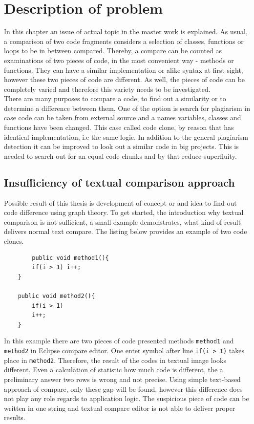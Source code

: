\documentclass{report}
\begin{document}
\chapter{Description of problem}
\label{cha:Description}
In this chapter an issue of actual topic in the master work is explained. As usual, a comparison of two code fragments considers a selection of classes, functions or loops to be in between compared. Thereby, a compare can be counted as examinations of two pieces of code, in the most convenient way - methods or functions. They can have a similar implementation or alike syntax at first sight, however these two pieces of code are different. As well, the pieces of code can be completely varied and therefore this variety needs to be investigated. 
\\
There are many purposes to compare a code, to find out a similarity or to determine a difference between them. One of the option is search for plagiarism in case code can be taken from external source and a names variables, classes and functions have been changed. This case called code clone, by reason that has identical implementation, i.e the same logic. In addition to the general plagiarism detection it can be improved to look out a similar code in big projects. This is needed to search out for an equal code chunks and by that reduce superfluity.

\section{Insufficiency of textual comparison approach}
Possible result of this thesis is development of concept or and idea to find out code difference using graph theory. To get started, the introduction why textual comparison is not sufficient, a small example demonstrates, what kind of result delivers normal text compare. The listing below provides an example of two code clones.

 \newpage
\begin{lstlisting}
		public void method1(){
		if(i > 1) i++;
	}
	
	public void method2(){
		if(i > 1) 
		i++;
	}

\end{lstlisting}
	
In this example there are two pieces of code presented methods \texttt{method1} and \texttt{method2} in Eclipse compare editor. One enter symbol after line \texttt{if(i > 1)} takes place in \texttt{method2}. Therefore, the result of the codes in textual image looks different. Even a calculation of statistic how much code is different, the a preliminary answer two rows is wrong and not precise.
Using simple text-based approach of compare, only these gap will be found, however this difference does not play any role regards to application logic. The suspicious piece of code can be written in one string and textual compare editor is not able to deliver proper results.
\end{document}
